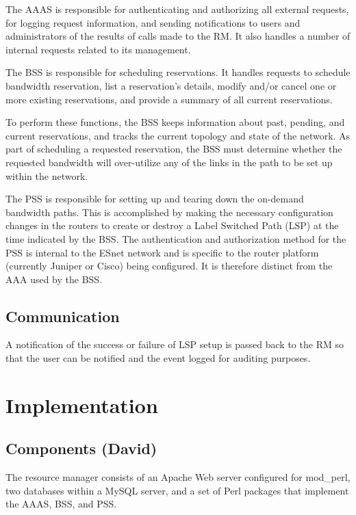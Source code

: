 \documentclass[conference]{IEEEtran}
\begin{document}
The AAAS is responsible for authenticating and authorizing all external 
requests, for logging request information, and sending notifications to
users and administrators of the results of calls made to the RM.  It also
handles a number of internal requests related to its management.

The BSS is responsible for scheduling reservations.  It handles
requests to schedule bandwidth reservation, list a reservation's details,
modify and/or cancel one or more existing reservations, and provide a summary
of all current reservations.

To perform these functions, the BSS keeps information about past,
pending, and current reservations, and tracks the current topology and state of
the network.  As part of scheduling a requested reservation, the BSS must
determine whether the requested bandwidth will over-utilize any of the links
in the path to be set up within the network.

The PSS is responsible for setting up and tearing down the on-demand bandwidth 
paths. This is accomplished by making the necessary configuration changes in 
the routers to create or destroy a Label Switched Path (LSP) at the time
indicated by the BSS. The authentication and authorization method for the PSS 
is internal to the ESnet network and is specific to the router platform 
(currently Juniper or Cisco) being configured.  It is therefore distinct from 
the AAA used by the BSS.

\subsection{Communication}

A notification of the success or failure of LSP setup is 
passed back to the RM so that the user can be notified and the event 
logged for auditing purposes.


\section{Implementation}

\subsection{Components (David)}

The resource manager consists of an Apache Web server configured for
mod\_perl, two databases within a MySQL server, and a set of Perl 
packages that implement the AAAS, BSS, and PSS.
\end{document}
